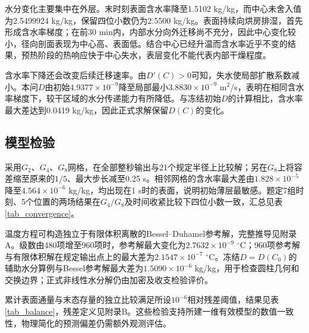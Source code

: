 水分变化主要集中在外层。末时刻表面含水率降至1.5102 kg/kg，而中心未舍入值为2.5499924 kg/kg，保留四位小数仍为2.5500 kg/kg。表面持续向烘房排湿，首先形成含水率梯度；在前30 min内，内部水分向外迁移尚不充分，因此中心变化较小，径向剖面表现为中心高、表面低。结合中心已经升温而含水率近乎不变的结果，预热阶段的热响应快于中心失水，表层变化不能代表内部干燥程度。

含水率下降还会改变后续迁移速率。由$D'(C)>0$可知，失水使局部扩散系数减小。本问$D$由初始$4.9377\times10^{-9}$降至局部最小$3.8830\times10^{-9}$ m$^2$/s，表明在相同含水率梯度下，较干区域的水分传递能力有所降低。与冻结初始$D$的计算相比，含水率最大差达到0.0419 kg/kg，因此正式求解保留$D(C)$的变化。

\subsection{模型检验}
\label{sec_q1_validation}
采用$G_2$、$G_4$、$G_8$网格，在全部整秒输出与21个规定半径上比较解；另在$G_8$上将容差缩至原来的$1/5$、最大步长减至0.25 s。相邻网格的含水率最大差由$1.828\times10^{-5}$降至$4.564\times10^{-6}$ kg/kg，均出现在1 s时的表面，说明初始薄层最敏感。题定7组时刻、5个位置的两场结果在$G_4/G_8$及时间收紧比较下四位小数一致，汇总见表\ref{tab_convergence}。

温度方程可构造独立于有限体积离散的Bessel--Duhamel参考解，完整推导见附录A。级数由480项增至960项时，参考解最大变化为$2.7632\times10^{-9}$ $^\circ$C；960项参考解与有限体积解在规定输出点上的最大差为$2.1547\times10^{-7}$ $^\circ$C。冻结$D=D(C_0)$的辅助水分算例与Bessel参考解最大差为$1.5090\times10^{-6}$ kg/kg，用于检查圆柱几何和交换边界；正式非线性水分解仍由加密及收支检验评价。

累计表面通量与末态存量的独立比较满足所设$10^{-6}$相对残差阈值，结果见表\ref{tab_balance}，残差定义见附录B。这些检验支持所建一维有效模型的数值一致性，物理简化的预测偏差仍需额外观测评估。
\FloatBarrier
